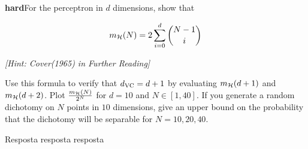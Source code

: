 \begin{enunciado}{9}
    \textbf{hard}\quad For the perceptron in $d$ dimensions, show that
    
    $$ m_{\mathcal{H}}(N) = 2 \sum\limits_{i=0}^d {{N-1} \choose {i}} $$
    
    \textit{[Hint: Cover(1965) in Further Reading]}
    
    Use this formula to verify that $d_{\text{VC}} = d + 1$ by evaluating $m_{\mathcal{H}}(d+1)$ and $m_{\mathcal{H}}(d+2)$.
    Plot $\frac{m_{\mathcal{H}}(N)}{2^N}$ for $d = 10$ and $N \in [1,40]$. If you generate a random dichotomy on $N$ points in $10$ dimensions, give an upper bound on the probability that the dichotomy will be separable for $N = 10, 20, 40$.
\end{enunciado}

Resposta resposta resposta